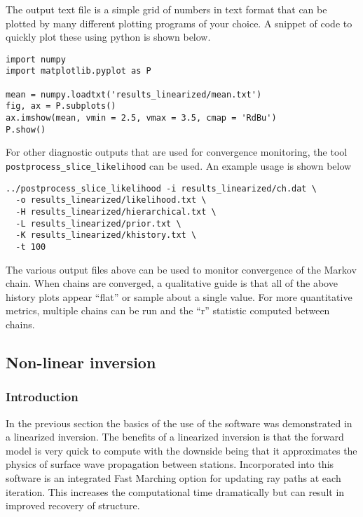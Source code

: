 \documentclass[a4paper,12pt]{article}
\begin{document}
The output text file is a simple grid of numbers in text format that can
be plotted by many different plotting programs of your choice. A snippet
of code to quickly plot these using python is shown below.

\begin{verbatim}
import numpy
import matplotlib.pyplot as P

mean = numpy.loadtxt('results_linearized/mean.txt')
fig, ax = P.subplots()
ax.imshow(mean, vmin = 2.5, vmax = 3.5, cmap = 'RdBu')
P.show()
\end{verbatim}

For other diagnostic outputs that are used for convergence monitoring,
the tool {\tt postprocess\_slice\_likelihood} can be used. An example
usage is shown below

\begin{verbatim}
../postprocess_slice_likelihood -i results_linearized/ch.dat \
  -o results_linearized/likelihood.txt \
  -H results_linearized/hierarchical.txt \
  -L results_linearized/prior.txt \
  -K results_linearized/khistory.txt \
  -t 100
\end{verbatim}

The various output files above can be used to monitor convergence of
the Markov chain. When chains are converged, a qualitative guide is
that all of the above history plots appear ``flat'' or sample about a
single value. For more quantitative metrics, multiple chains can be
run and the ``r'' statistic computed between
chains\citep{Hawkins:2017:A}.

\subsection{Non-linear inversion}

\subsubsection{Introduction}

In the previous section the basics of the use of the software was
demonstrated in a linearized inversion. The benefits of a linearized
inversion is that the forward model is very quick to compute with the downside
being that it approximates the physics of surface wave propagation between
stations. Incorporated into this software is an integrated Fast Marching
option for updating ray paths at each iteration. This increases the
computational time dramatically but can result in improved recovery of
structure.
\end{document}
